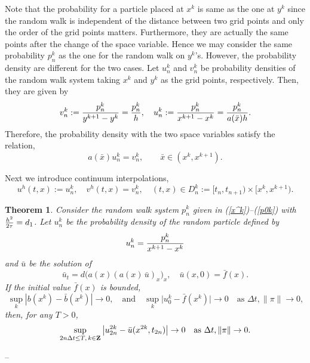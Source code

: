 \documentclass[11pt]{amsart}
\def\d{d}
\def\Z{{\bf Z}}
\newtheorem{theorem}{Theorem}[section]
\begin{document}
Note that the probability for a particle placed at $x^k$ is same as the one at $y^k$ since the random walk is independent of the distance between two grid points and only the order of the grid points matters. Furthermore, they are actually the same points after the change of the space variable. Hence we may consider the same probability $p^k_n$ as the one for the random walk on $y^k$'s. However, the probability density are different for the two cases. Let $u^k_n$ and $v^k_n$ be probability densities of the random walk system taking $x^k$ and $y^k$ as the grid points, respectively. Then, they are given by
$$
v^k_n:={p^k_n\over y^{k+1}-y^k}={p^k_n\over h},\quad
u^k_n:={p^k_n\over x^{k+1}-x^k}={p^k_n\over a(\bar x)h}.
$$
Therefore, the probability density with the two space variables satisfy the relation,
\begin{equation}\label{u-v}
  a(\bar x)u^k_n=v^k_n,\qquad \bar x\in (x^k,x^{k+1}).
\end{equation}

Next we introduce continuum interpolations,
$$
u^h(t,x):= u^k_n,\quad v^h(t,x)=v^k_n,\quad (t,x)\in D^k_n:=[t_n,t_{n+1})\times [x^k,x^{k+1}).
$$



\begin{theorem}\label{thm1} Consider the random walk system $p_n^k$ given in (\ref{x^k})--(\ref{p0k}) with ${h^2\over2\tau}=d_1$. Let $u_{n}^{k}$ be the probability density of the random particle defined by
$$
u_{n}^{k}={p_{n}^{k}\over x^{k+1}-x^{k}}
$$
and $\bar u$ be the solution of
\begin{equation}\label{DiffusionEqn2}
\bar u_t=\d\big(a(x) (a(x)\,\bar u)_x \big)_x,\quad\bar u(x,0)=\bar f(x).
\end{equation}
If the initial value $\bar f(x)$ is bounded,
\begin{equation}\label{Assumptions}
\sup_k | b(x^{k})-\bar b(x^{k}) | \to 0, \quad\text{and}\quad
\sup_k \Big| u^{k}_0 -\bar f(x^{k}) \Big| \to 0 \quad \text{as $\Delta t,\|\pi\|\to 0$,}
\end{equation}
then, for any $T>0$,
\[
\sup_{2n\Delta t\leq T,\,k\in\Z} \big| u^{2k}_{2n} - \bar u(x^{2k},t_{2n}) \big| \to 0 \quad \text{as $\Delta t, \|\pi\| \to 0.$}
\]
\end{theorem}

--
\end{document}
